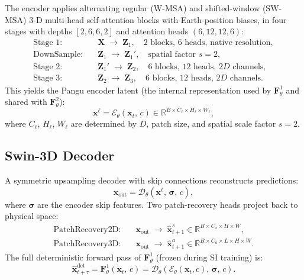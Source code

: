 \documentclass[11pt]{article}
\begin{document}
The encoder applies alternating regular (W-MSA) and shifted-window (SW-MSA)
3-D multi-head self-attention blocks with Earth-position biases, in four stages
with depths $[2,6,6,2]$ and attention heads $(6,12,12,6)$:
\begin{align}
  \text{Stage 1:}&\quad \mathbf{X} \;\to\; \mathbf{Z}_1,
    \quad\text{2 blocks, 6 heads, native resolution},\\
  \text{DownSample:}&\quad \mathbf{Z}_1 \;\to\; \mathbf{Z}_1',
    \quad\text{spatial factor } s=2,\\
  \text{Stage 2:}&\quad \mathbf{Z}_1' \;\to\; \mathbf{Z}_2,
    \quad\text{6 blocks, 12 heads, }2D\text{ channels},\\
  \text{Stage 3:}&\quad \mathbf{Z}_2 \;\to\; \mathbf{Z}_3,
    \quad\text{6 blocks, 12 heads, }2D\text{ channels}.
\end{align}
This yields the Pangu encoder latent (the internal representation used by
$\mathbf{F}^1_\theta$ and shared with $\mathbf{F}^2_\theta$):
\begin{equation}
  \mathbf{x}^{\ell}
  = \mathcal{E}_{\theta}\!\left(\mathbf{x}_t,\,c\right)
  \in \mathbb{R}^{B \times C_\ell \times H_\ell \times W_\ell},
\end{equation}
where $C_\ell$, $H_\ell$, $W_\ell$ are determined by $D$, patch size, and
spatial scale factor $s = 2$.

\subsection{Swin-3D Decoder}

A symmetric upsampling decoder with skip connections reconstructs predictions:
\begin{equation}
  \mathbf{x}_{\mathrm{out}}
  = \mathcal{D}_{\theta}\!\left(\mathbf{x}^{\ell},\,\bm{\sigma},\,c\right),
\end{equation}
where $\bm{\sigma}$ are the encoder skip features. Two patch-recovery heads
project back to physical space:
\begin{align}
  \text{PatchRecovery2D}:&\quad
    \mathbf{x}_{\mathrm{out}} \;\to\;
    \hat{\mathbf{x}}_{t+1}^s \in \mathbb{R}^{B \times C_s \times H \times W},\\
  \text{PatchRecovery3D}:&\quad
    \mathbf{x}_{\mathrm{out}} \;\to\;
    \hat{\mathbf{x}}_{t+1}^a \in \mathbb{R}^{B \times C_a \times L \times H \times W}.
\end{align}
The full deterministic forward pass of $\mathbf{F}^1_\theta$ (frozen during SI
training) is:
\begin{equation}
  \hat{\mathbf{x}}_{t+\tau}^{\mathrm{det}}
  = \mathbf{F}^1_\theta\!\left(\mathbf{x}_t,\,c\right)
  = \mathcal{D}_\theta\!\left(\mathcal{E}_\theta(\mathbf{x}_t, c),\,
    \bm{\sigma},\,c\right).
\end{equation}
\end{document}
